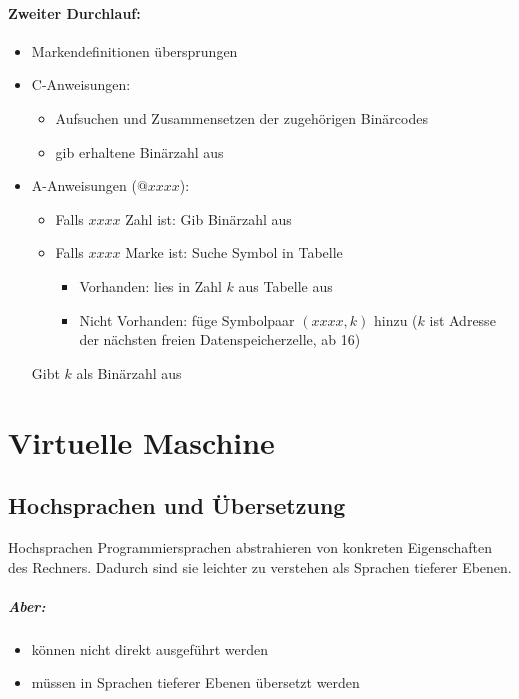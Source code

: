 \documentclass[12pt]{report}
\begin{document}
\subsubsection{Zweiter Durchlauf:}
\begin{itemize}
  \item Markendefinitionen übersprungen
  \item C-Anweisungen:
        \begin{itemize}
          \item Aufsuchen und Zusammensetzen der zugehörigen Binärcodes
          \item gib erhaltene Binärzahl aus
        \end{itemize}
  \item A-Anweisungen ($@xxxx$):
        \begin{itemize}
          \item Falls $xxxx$ Zahl ist: Gib Binärzahl aus
          \item Falls $xxxx$ Marke ist: Suche Symbol in Tabelle
                \begin{itemize}
                  \item Vorhanden: lies in Zahl $k$ aus Tabelle aus
                  \item Nicht Vorhanden: füge Symbolpaar $(xxxx, k)$ hinzu ($k$ ist Adresse der nächsten freien Datenspeicherzelle, ab 16)
                \end{itemize}
        \end{itemize}
        Gibt $k$ als Binärzahl aus
\end{itemize}


\chapter{Virtuelle Maschine}

\section{Hochsprachen und Übersetzung}
\begin{defbox}
  Hochsprachen Programmiersprachen abstrahieren von konkreten Eigenschaften des Rechners.
  Dadurch sind sie leichter zu verstehen als Sprachen tieferer Ebenen.
  \paragraph{Aber:}
  \begin{itemize}
    \item können nicht direkt ausgeführt werden
    \item müssen in Sprachen tieferer Ebenen übersetzt werden
  \end{itemize}
\end{defbox}
\end{document}
